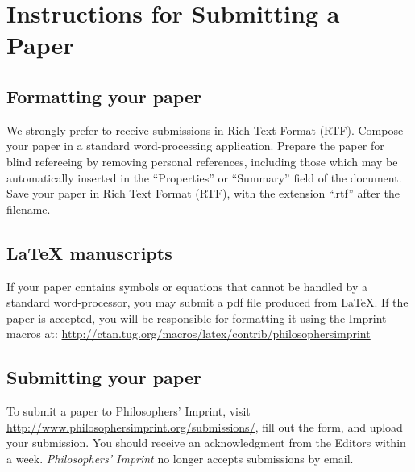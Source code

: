 \documentclass[noflushend]{philosophersimprint}
\begin{document}
\section{Instructions for Submitting a Paper}

\subsection{Formatting your paper}

We strongly prefer to receive submissions in Rich Text Format (RTF).
Compose your paper in a standard word-processing application. Prepare
the paper for blind refereeing by removing personal references,
including those which may be automatically inserted in the
``Properties'' or ``Summary'' field of the document. Save your paper in
Rich Text Format (RTF), with the extension ``.rtf'' after the filename.

\subsection{\LaTeX{} manuscripts}

If your paper contains symbols or equations that cannot be handled by
a standard word-processor, you may submit a pdf file produced from
LaTeX. If the paper is accepted, you will be responsible for
formatting it using the Imprint macros at:
\url{http://ctan.tug.org/macros/latex/contrib/philosophersimprint}

\subsection{Submitting your paper}

To submit a paper to Philosophers' Imprint, visit
\url{http://www.philosophersimprint.org/submissions/}, fill out the
form, and upload your submission. You should receive an acknowledgment
from the Editors within a week. \emph{Philosophers' Imprint} no longer
accepts submissions by email.


\end{document}
